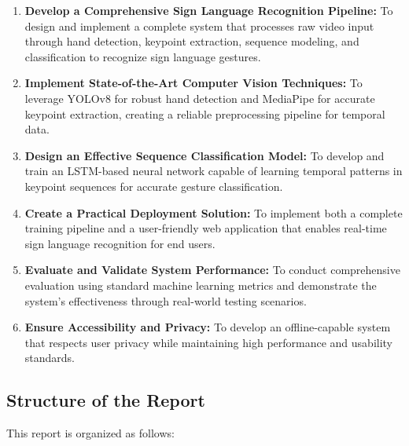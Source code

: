 \documentclass[11pt, a4paper]{article}
\begin{document}
\begin{enumerate}
    \item \textbf{Develop a Comprehensive Sign Language Recognition Pipeline:} To design and implement a complete system that processes raw video input through hand detection, keypoint extraction, sequence modeling, and classification to recognize sign language gestures.
    
    \item \textbf{Implement State-of-the-Art Computer Vision Techniques:} To leverage YOLOv8 for robust hand detection and MediaPipe for accurate keypoint extraction, creating a reliable preprocessing pipeline for temporal data.
    
    \item \textbf{Design an Effective Sequence Classification Model:} To develop and train an LSTM-based neural network capable of learning temporal patterns in keypoint sequences for accurate gesture classification.
    
    \item \textbf{Create a Practical Deployment Solution:} To implement both a complete training pipeline and a user-friendly web application that enables real-time sign language recognition for end users.
    
    \item \textbf{Evaluate and Validate System Performance:} To conduct comprehensive evaluation using standard machine learning metrics and demonstrate the system's effectiveness through real-world testing scenarios.
    
    \item \textbf{Ensure Accessibility and Privacy:} To develop an offline-capable system that respects user privacy while maintaining high performance and usability standards.
\end{enumerate}

\subsection{Structure of the Report}

This report is organized as follows:
\end{document}
